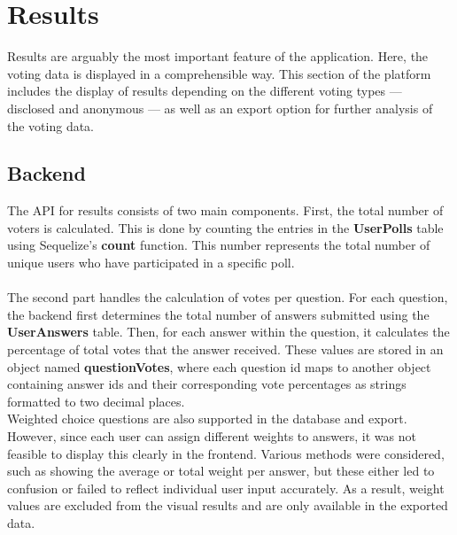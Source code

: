 \documentclass[a4paper,12pt]{report}
\begin{document}
\section{Results}
Results are arguably the most important feature of the application. Here, the voting data is displayed in a comprehensible way. This section of the platform includes the display of results depending on the different voting types — disclosed and anonymous — as well as an export option for further analysis of the voting data. 

\subsection{Backend}
The API for results consists of two main components. First, the total number of voters is calculated. This is done by counting the entries in the \textbf{UserPolls} table using Sequelize's \textbf{count} function. This number represents the total number of unique users who have participated in a specific poll. \\ \\
The second part handles the calculation of votes per question. For each question, the backend first determines the total number of answers submitted using the \textbf{UserAnswers} table. Then, for each answer within the question, it calculates the percentage of total votes that the answer received. These values are stored in an object named \textbf{questionVotes}, where each question id maps to another object containing answer ids and their corresponding vote percentages as strings formatted to two decimal places. \\
Weighted choice questions are also supported in the database and export. However, since each user can assign different weights to answers, it was not feasible to display this clearly in the frontend. Various methods were considered, such as showing the average or total weight per answer, but these either led to confusion or failed to reflect individual user input accurately. As a result, weight values are excluded from the visual results and are only available in the exported data.
\end{document}

